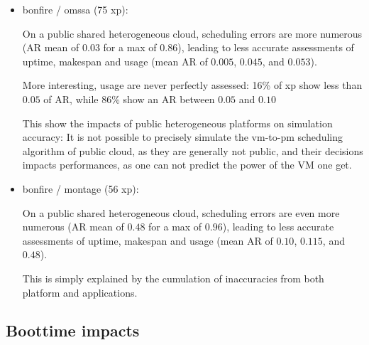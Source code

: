 {\begin{itemize}
      the last task assigned to node $n$ was 
      completed during the scheduling of the tasks which dependencies were satisfied 
      first. But those tasks were intended to 
      This completion lead 
      Schlouder to mistake the state of the 
      
      
 
 \item bonfire / omssa (75 xp): 
 
      
      
      
      
      On a public shared heterogeneous cloud, scheduling errors are more numerous 
      (AR mean of $0.03$ for a max of $0.86$), leading to less accurate assessments
      of uptime, makespan and usage (mean AR of $0.005$, $0.045$, and $0.053$).

      More interesting, usage are never perfectly assessed: 
      16\% of xp show less than $0.05$ of AR, 
      while 86\% show an AR between $0.05$ and $0.10$
      
      This show the impacts of public heterogeneous platforms on simulation
      accuracy: 
      It is not possible to precisely simulate the vm-to-pm scheduling algorithm of 
      public cloud, as they are generally not public, and their decisions impacts 
      performances, as one can not predict the power of the VM one get.
 
 \item bonfire / montage (56 xp): 
 
      
      
      
 
      On a public shared heterogeneous cloud, scheduling errors are even more numerous 
      (AR mean of $0.48$ for a max of $0.96$), leading to less accurate assessments
      of uptime, makespan and usage (mean AR of $0.10$, $0.115$, and $0.48$).
      
      This is simply explained by the cumulation of inaccuracies from 
      both platform and applications. 
\end{itemize}



\subsection{Boottime impacts}

}
